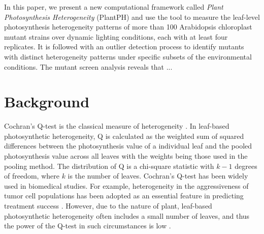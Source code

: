 \documentclass{bioinfo}
\begin{document}
{%


In this paper, we present a new computational framework called {\it Plant Photosynthesis Heterogeneity} (PlantPH) and use the tool to measure the leaf-level photosynthesis heterogeneity patterns of more than 100 Arabidopsis chloroplast mutant strains over dynamic lighting conditions, each with at least four replicates. It is followed with an outlier detection process to identify mutants with distinct heterogeneity patterns under specific subsets of the environmental conditions.
%
The mutant screen analysis reveals that ...



\section{Background}

Cochran's Q-test is the classical measure of heterogeneity \citep{conover1999Practical}. In leaf-based photosynthetic heterogeneity, Q is calculated as the weighted sum of squared differences between the photosynthesis value of a individual leaf and the pooled photosynthesis value across all leaves with the weights being those used in the pooling method. The distribution of Q is a chi-square statistic with $k-1$ degrees of freedom, where $k$ is the number of leaves. Cochran's Q-test has been widely used in biomedical studies. For example, heterogeneity in the aggressiveness of tumor cell populations has been adopted as an essential feature in predicting treatment success \citep{OSullivan2003}. However, due to the nature of plant, leaf-based photosynthetic heterogeneity often includes a small number of leaves, and thus the power of the Q-test in such circumstances is low \citep{higgins2003measuring, gavaghan2000evaluation}.
%


}
\end{document}
